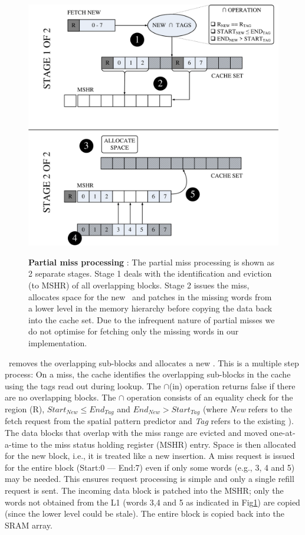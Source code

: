 \begin{figure}[h]
  \includegraphics[width=\textwidth]{files/Figures/06-PartialMiss.pdf}
  \\
  \caption[Partial Miss]{\textbf{Partial miss processing} : The partial miss processing is shown as 2 separate stages. Stage 1 deals with the identification and eviction (to MSHR) of all overlapping blocks. Stage 2 issues the miss, allocates space for the new \AB\ and patches in the missing words from a lower level in the memory hierarchy before copying the data back into the cache set. Due to the infrequent nature of partial misses we do not optimise for fetching only the missing words in our implementation. }
  \label{fig:partial-miss}
\end{figure}

\clearpage

\AC\ removes the overlapping sub-blocks and allocates a new \AB{}. This is a multiple step process:  On a miss, the cache identifies the overlapping sub-blocks in the cache using the tags read out during lookup. The $\cap$(in) operation returns false if there are no overlapping blocks. The $\cap$ operation consists of an equality check for the region (R), $Start_{New} \leq End_{Tag}$ and $End_{New} > Start_{Tag}$ (where \textit{New} refers to the fetch request from the spatial pattern predictor and \textit{Tag} refers to the existing \AB{}).  The data blocks that overlap with the miss range are evicted and moved one-at-a-time to the miss status holding register (MSHR) entry.  Space is then allocated for the new block, i.e., it is treated like a new insertion. A miss request is issued for the entire block (Start:0 --- End:7) even if only some words (e.g., 3, 4 and 5) may be needed. This ensures request processing is simple and only a single refill request is sent.  The incoming data block is patched into the MSHR; only the words not obtained from the L1 (words 3,4 and 5 as indicated in Fig\ref{fig:partial-miss}) are copied (since the lower level could be stale).  The entire block is copied back into the SRAM array.


